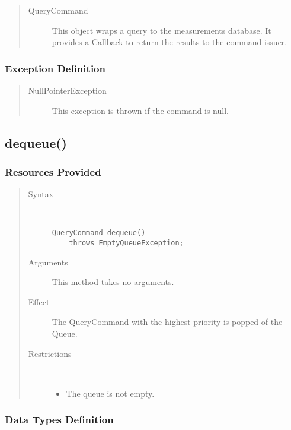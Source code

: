 \begin{quote}
	\begin{description}
		\item[QueryCommand] This object wraps a query to the measurements database. It
		provides a Callback to return the results to the command issuer.
	\end{description} 
\end{quote}

\subsubsection{Exception Definition}

\begin{quote}
	\begin{description}
		\item[NullPointerException] This exception is thrown if the command is null.
	\end{description} 
\end{quote}

\subsection{dequeue()}

\subsubsection{Resources Provided}

\begin{quote}
	\begin{description}
		\item[Syntax] \ 
		\begin{verbatim}
QueryCommand dequeue() 
    throws EmptyQueueException;
		\end{verbatim}
		\item[Arguments] This method takes no arguments.
		\item[Effect] The QueryCommand with the highest priority is popped of the
		Queue.
		\item[Restrictions] \ 
		\begin{itemize}
			\item The queue is not empty. 
		\end{itemize}
	\end{description} 
\end{quote}

\subsubsection{Data Types Definition}

